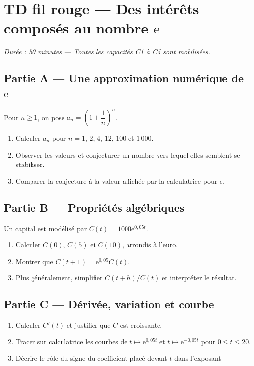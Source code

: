 
\section*{TD fil rouge — Des intérêts composés au nombre $\mathrm{e}$}
\textit{Durée : 50 minutes — Toutes les capacités C1 à C5 sont mobilisées.}

\subsection*{Partie A — Une approximation numérique de $\mathrm{e}$}
Pour $n\geqslant1$, on pose $a_n=\left(1+\dfrac1n\right)^n$.
\begin{enumerate}
\item Calculer $a_n$ pour $n=1$, $2$, $4$, $12$, $100$ et $1\,000$.
\item Observer les valeurs et conjecturer un nombre vers lequel elles semblent se stabiliser.
\item Comparer la conjecture à la valeur affichée par la calculatrice pour $\mathrm{e}$.
\end{enumerate}

\subsection*{Partie B — Propriétés algébriques}
Un capital est modélisé par $C(t)=1000\mathrm{e}^{0{,}05t}$.
\begin{enumerate}[resume]
\item Calculer $C(0)$, $C(5)$ et $C(10)$, arrondis à l'euro.
\item Montrer que $C(t+1)=\mathrm{e}^{0{,}05}C(t)$.
\item Plus généralement, simplifier $C(t+h)/C(t)$ et interpréter le résultat.
\end{enumerate}

\subsection*{Partie C — Dérivée, variation et courbe}
\begin{enumerate}[resume]
\item Calculer $C'(t)$ et justifier que $C$ est croissante.
\item Tracer sur calculatrice les courbes de $t\mapsto\mathrm{e}^{0{,}05t}$ et $t\mapsto\mathrm{e}^{-0{,}05t}$ pour $0\leqslant t\leqslant20$.
\item Décrire le rôle du signe du coefficient placé devant $t$ dans l'exposant.
\end{enumerate}

